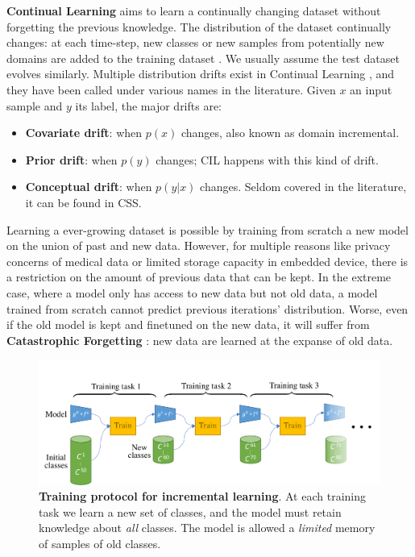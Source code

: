 \textbf{Continual Learning} aims to learn a continually changing dataset without forgetting the
previous knowledge. The distribution of the dataset continually changes: \eg at each time-step, new
classes or new samples from potentially new domains are added to the training dataset
\citep{lomonaco2017core50}. We usually assume the test dataset evolves similarly. Multiple
distribution drifts exist in Continual Learning
\citep{morenotorresa2012datasetshift,lesort2021driftanalysis}, and they have been called under
various names in the literature. Given $x$ an input sample and $y$ its label, the major drifts are:

\begin{itemize}
      \item \textbf{Covariate drift}: when $p(x)$ changes, also known as domain incremental.
      \item \textbf{Prior drift}: when $p(y)$ changes; \ac{CIL} happens with this kind of drift.
      \item \textbf{Conceptual drift}: when $p(y | x)$ changes. Seldom covered in the literature, it
            can be found in \acf{CSS}.
\end{itemize}

Learning a ever-growing dataset is possible by training from scratch a new model on the
union of past and new data. However, for multiple reasons like privacy concerns of medical data or
limited storage capacity in embedded device, there is a restriction on the amount of previous data
that can be kept. In the extreme case, where a model only has access to new data but not old data, a
model trained from scratch cannot predict previous iterations' distribution. Worse, even if the old
model is kept and finetuned on the new data, it will suffer from \textbf{Catastrophic Forgetting}
\citep{robins1995catastrophicforgetting}: new data are learned at the expanse of old data.

\begin{figure}[tb]
      \begin{center}
            \includegraphics[width=1.0\linewidth]{images/related/protocol}
      \end{center}
      \caption{\textbf{Training protocol for incremental learning}. At each training task we learn a
            new set of classes, and the model must retain knowledge about \textit{all} classes. The
            model is allowed a \textit{limited} memory of samples of old classes.}
      \label{fig:related_protocol}
\end{figure}

